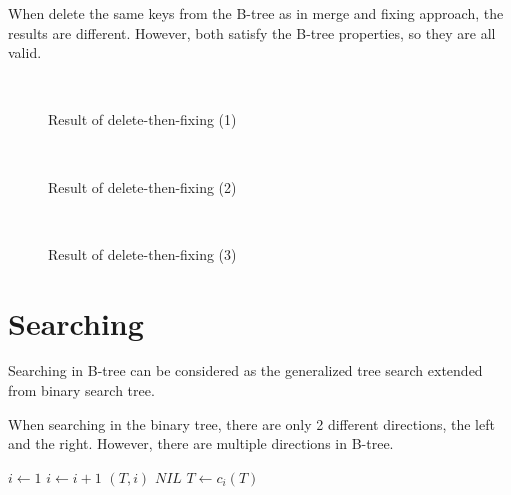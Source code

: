 \documentclass[UTF8]{article}
\begin{document}
When delete the same keys from the B-tree as in merge and fixing
approach, the results are different. However, both satisfy
the B-tree properties, so they are all valid.

\begin{figure}[htbp]
  \centering
  \\
  \caption{Result of delete-then-fixing (1)} \label{fig:result-del-fp1}
\end{figure}

\begin{figure}[htbp]
  \centering
   \\
  \caption{Result of delete-then-fixing (2)} \label{fig:result-del-fp2}
\end{figure}

\begin{figure}[htbp]
  \centering
   \\
  \caption{Result of delete-then-fixing (3)} \label{fig:result-del-fp3}
\end{figure}


\section{Searching}

Searching in B-tree can be considered as the generalized
tree search extended from binary search tree.

When searching in the binary tree, there are only 2 different directions,
the left and the right. However, there are multiple directions in B-tree.

\begin{algorithmic}[1]
  \Loop
    \State $i \gets 1$
      \State $i \gets i+1$
    \EndWhile
      \State \Return $(T, i)$
    \EndIf
      \State \Return $NIL$ 
    \Else
      \State $T \gets c_i(T)$
    \EndIf
  \EndLoop
\EndFunction
\end{algorithmic}
\end{document}
